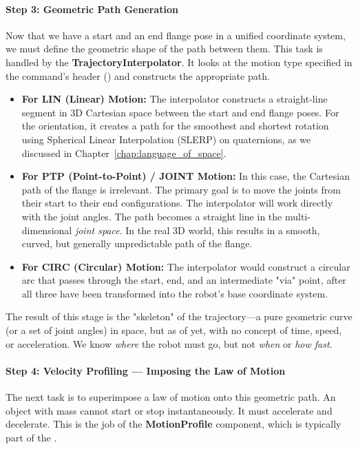 
\paragraph{Step 3: Geometric Path Generation}
Now that we have a start and an end flange pose in a unified coordinate system, we must define the geometric shape of the path between them. This task is handled by the \textbf{TrajectoryInterpolator}. It looks at the motion type specified in the command's header () and constructs the appropriate path.
\begin{itemize}
    \item \textbf{For LIN (Linear) Motion:} The interpolator constructs a straight-line segment in 3D Cartesian space between the start and end flange poses. For the orientation, it creates a path for the smoothest and shortest rotation using Spherical Linear Interpolation (SLERP) on quaternions, as we discussed in Chapter~\ref{chap:language_of_space}.
    \item \textbf{For PTP (Point-to-Point) / JOINT Motion:} In this case, the Cartesian path of the flange is irrelevant. The primary goal is to move the joints from their start to their end configurations. The interpolator will work directly with the joint angles. The path becomes a straight line in the multi-dimensional \textit{joint space}. In the real 3D world, this results in a smooth, curved, but generally unpredictable path of the flange.
    \item \textbf{For CIRC (Circular) Motion:} The interpolator would construct a circular arc that passes through the start, end, and an intermediate "via" point, after all three have been transformed into the robot's base coordinate system.
\end{itemize}

The result of this stage is the "skeleton" of the trajectory—a pure geometric curve (or a set of joint angles) in space, but as of yet, with no concept of time, speed, or acceleration. We know \textit{where} the robot must go, but not \textit{when} or \textit{how fast}.

\paragraph{Step 4: Velocity Profiling — Imposing the Law of Motion}
The next task is to superimpose a law of motion onto this geometric path. An object with mass cannot start or stop instantaneously. It must accelerate and decelerate. This is the job of the \textbf{MotionProfile} component, which is typically part of the .

